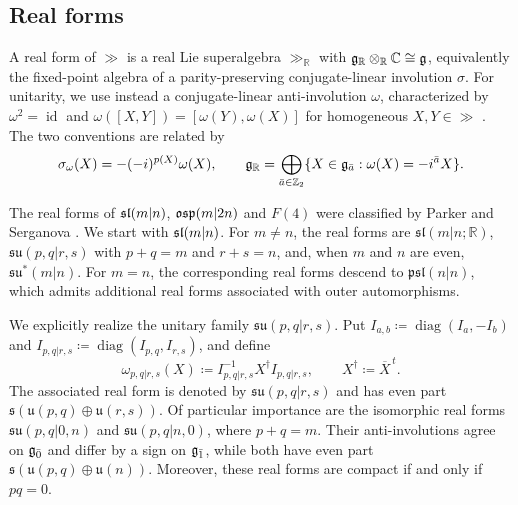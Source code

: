 \subsection{Real forms}\label{subsec:real_forms_slmb}
A real form of $\gg$ is a real Lie superalgebra $\gg_{\mathbb R}$ with $\gg_{\mathbb R}\otimes_{\mathbb R}\CC \cong\gg$, equivalently the fixed-point algebra of a parity-preserving conjugate-linear involution $\sigma$. For unitarity, we use instead a conjugate-linear anti-involution $\omega$, characterized by $\omega^2=\operatorname{id}$ and $\omega([X,Y])=[\omega(Y),\omega(X)]$ for homogeneous $X,Y\in\gg$ \cite{SchmidtDirac,Schmidt,SchmidtWalcher}. The two conventions are related by
\begin{equation}
\sigma_\omega(X)=-(-i)^{p(X)}\omega(X),\qquad
\gg_{\mathbb R}=\bigoplus_{\bar{a}\in \ZZ_{2}}\{X\in\gg_{\bar a}:\omega(X)=-i^{\bar{a}}X\}.
\label{eq:real-form-anti-involution}
\end{equation}

The real forms of $\sl(m\vert n)$, $\osp(m\vert 2n)$ and $F(4)$ were classified by Parker \cite{ParkerRealForms} and Serganova \cite{serganova1983classification}. We start with $\sl(m\vert n)$. For $m\neq n$, the real forms are $\mathfrak{sl}(m\vert n;\mathbb R)$, $\mathfrak{su}(p,q\vert r,s)$ with $p+q=m$ and $r+s=n$, and, when $m$ and $n$ are even, $\mathfrak{su}^{\ast}(m\vert n)$. For $m=n$, the corresponding real forms descend to $\mathfrak{psl}(n\vert n)$, which admits additional real forms associated with outer automorphisms. 

We explicitly realize the unitary family $\mathfrak{su}(p,q\vert r,s)$. Put $I_{a,b}\coloneqq\operatorname{diag}(I_a,-I_b)$ and $I_{p,q\vert r,s}\coloneqq\operatorname{diag}(I_{p,q},I_{r,s})$, and define
\begin{equation}
\omega_{p,q\vert r,s}(X)
\coloneqq I_{p,q\vert r,s}^{-1}X^\dagger I_{p,q\vert r,s},
\qquad X^\dagger\coloneqq\overline{X}^{\,t}.
\label{eq:unitary-anti-involution}
\end{equation}
The associated real form is denoted by $\mathfrak{su}(p,q\vert r,s)$ and has even part $\mathfrak{s}(\mathfrak{u}(p,q)\oplus\mathfrak{u}(r,s))$. Of particular importance are the isomorphic real forms $\mathfrak{su}(p,q\vert0,n)$ and $\mathfrak{su}(p,q\vert n,0)$, where $p+q=m$. Their anti-involutions agree on $\even$ and differ by a sign on $\odd$, while both have even part $\mathfrak{s}(\mathfrak{u}(p,q)\oplus\mathfrak{u}(n))$. Moreover, these real forms are compact if and only if $pq=0$. 

